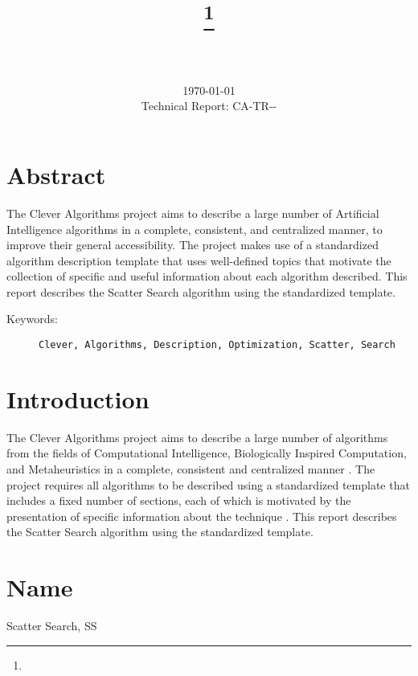 \documentclass[a4paper, 11pt]{article}
\title{{\myreporttitle}\footnote{\myreportlicense}}
\author{\myreportauthor\\{\myreportemail}\\\small\myreportproject}
\date{\today\\{\small{Technical Report: CA-TR-{\myreportdate}-\myreportversion}}}
\begin{document}
\maketitle

\section*{Abstract} 
The Clever Algorithms project aims to describe a large number of Artificial Intelligence algorithms in a complete, consistent, and centralized manner, to improve their general accessibility. 
The project makes use of a standardized algorithm description template that uses well-defined topics that motivate the collection of specific and useful information about each algorithm described.
This report describes the Scatter Search algorithm using the standardized template.

\begin{description}
	\item[Keywords:] {\small\texttt{Clever, Algorithms, Description, Optimization, Scatter, Search}}
\end{description} 

\section{Introduction} 
\label{sec:intro}
The Clever Algorithms project aims to describe a large number of algorithms from the fields of Computational Intelligence, Biologically Inspired Computation, and Metaheuristics in a complete, consistent and centralized manner \cite{Brownlee2010}.
The project requires all algorithms to be described using a standardized template that includes a fixed number of sections, each of which is motivated by the presentation of specific information about the technique \cite{Brownlee2010a}.
This report describes the Scatter Search algorithm using the standardized template.

\section{Name} 
\label{sec:name}
Scatter Search, SS
\end{document}
